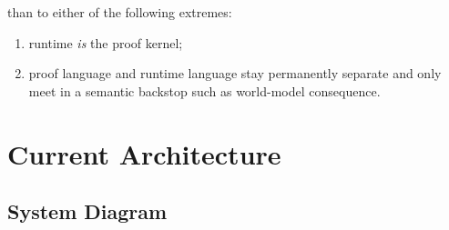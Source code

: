 \documentclass[11pt]{article}
\theoremstyle{remark}
\begin{document}
\begin{center}
\end{center}

than to either of the following extremes:

\begin{enumerate}[nosep]
  \item runtime \emph{is} the proof kernel;
  \item proof language and runtime language stay permanently separate and only
  meet in a semantic backstop such as world-model consequence.
\end{enumerate}

\section{Current Architecture}
\label{sec:arch}

\subsection{System Diagram}
\end{document}
